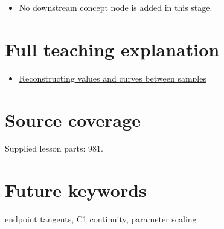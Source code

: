 \begin{itemize}
\tightlist
\item
  No downstream concept node is added in this stage.
\end{itemize}

\section{Full teaching explanation}\label{appendix-db3aef8f2fd6-full-teaching-explanation}

\begin{itemize}
\tightlist
\item
  \href{Continuous\%20Notes/Computing\%20Foundations\%20-\%20From\%20Bits\%20to\%20C++\%20and\%20Systems\%20APIs\#Reconstructing\%20values\%20and\%20curves\%20between\%20samples}{Reconstructing values and curves between samples}
\end{itemize}

\section{Source coverage}\label{appendix-db3aef8f2fd6-source-coverage}

Supplied lesson parts: 981.

\section{Future keywords}\label{appendix-db3aef8f2fd6-future-keywords}

endpoint tangents, C1 continuity, parameter scaling
